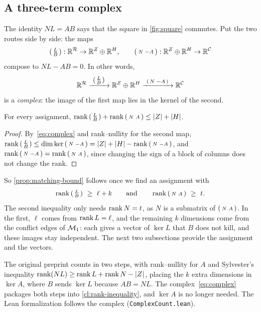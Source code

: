 \subsection{A three-term complex}\label{sec:rank}

The identity $NL=AB$ says that the square in \cref{fig:square} commutes.
Put the two routes side by side: the maps
\[
 \left(\begin{smallmatrix}L\\ B\end{smallmatrix}\right):\mathbb R^{\mathcal R}\to\mathbb R^{Z}\oplus\mathbb R^{H},\qquad
 \left(\begin{smallmatrix}N & -A\end{smallmatrix}\right):\mathbb R^{Z}\oplus\mathbb R^{H}\to\mathbb R^{\mathcal C}
\]
compose to $NL-AB=0$. In other words,
\begin{equation}\label{eq:complex}
 \RR^{\Rf}\xrightarrow{\ \LB\ }\RR^{Z}\oplus\RR^{H}\xrightarrow{\ \NmA\ }\RR^{\Cf}
\end{equation}
is a \emph{complex}: the image of the first map lies in the kernel of the
second.

\begin{claim}\label{cl:rank-inequality}
For every assignment, $\operatorname{rank}\left(\begin{smallmatrix}L\\ B\end{smallmatrix}\right)+\operatorname{rank}\left(\begin{smallmatrix}N & A\end{smallmatrix}\right)\le\lvert Z\rvert+\lvert H\rvert$.
\end{claim}

\begin{proof}
By~\eqref{eq:complex} and rank--nullity for the second map,
$\operatorname{rank}\left(\begin{smallmatrix}L\\ B\end{smallmatrix}\right)\le\dim\ker\left(\begin{smallmatrix}N & -A\end{smallmatrix}\right)=\lvert Z\rvert+\lvert H\rvert-\operatorname{rank}\left(\begin{smallmatrix}N & -A\end{smallmatrix}\right)$, and
$\operatorname{rank}\left(\begin{smallmatrix}N & -A\end{smallmatrix}\right)=\operatorname{rank}\left(\begin{smallmatrix}N & A\end{smallmatrix}\right)$, since changing the sign of a block of columns does
not change the rank.
\end{proof}

So \cref{prop:matching-bound} follows once we find an assignment with
\begin{equation}\label{eq:two-lower-bounds}
 \operatorname{rank}\left(\begin{smallmatrix}L\\ B\end{smallmatrix}\right)\ \ge\ \ell+k\qquad\text{and}\qquad \operatorname{rank}\left(\begin{smallmatrix}N & A\end{smallmatrix}\right)\ \ge\ t .
\end{equation}
The second inequality only needs $\operatorname{rank} N=t$, as $N$ is a submatrix of
$\left(\begin{smallmatrix}N & A\end{smallmatrix}\right)$. In the first, $\ell$ comes from $\operatorname{rank} L=\ell$, and the remaining
$k$ dimensions come from the conflict edges of $\mathcal M_1$: each gives a vector
of $\ker L$ that $B$ does not kill, and these images stay independent. The
next two subsections provide the assignment and the vectors.

\begin{remark}
The original preprint counts in two steps, with rank--nullity for $A$ and
Sylvester's inequality $\operatorname{rank}(NL)\ge\operatorname{rank} L+\operatorname{rank} N-\lvert Z\rvert$, placing the
$k$ extra dimensions in $\ker A$, where $B$ sends $\ker L$ because
$AB=NL$. The complex~\eqref{eq:complex} packages both steps into
\cref{cl:rank-inequality}, and $\ker A$ is no longer needed. The Lean
formalization follows the complex (\texttt{ComplexCount.lean}).
\end{remark}


